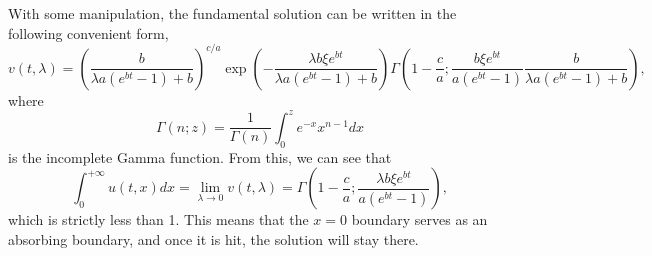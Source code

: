 \documentclass[12pt]{article}
\begin{document}
    With some manipulation, the fundamental solution can be written in the following convenient form,
    \begin{equation}
      v(t,\lambda) = \left(\frac{b}{\lambda a(e^{bt}-1)+b}\right)^{c/a}\exp\left(-\frac{\lambda b\xi e^{bt}}{\lambda a(e^{bt}-1)+b}\right)
                      \Gamma\left(1-\frac{c}{a};\frac{b\xi e^{bt}}{a(e^{bt}-1)}\frac{b}{\lambda a(e^{bt}-1)+b}\right),
      \label{solution1}
    \end{equation}
    where
    \begin{equation}
      \Gamma(n;z)=\frac{1}{\Gamma(n)}\int_0^ze^{-x}x^{n-1}dx
    \end{equation}
    is the incomplete Gamma function. From this, we can see that
    \begin{equation}
      \int_0^{+\infty}u(t,x)dx = \lim_{\lambda\rightarrow 0}v(t,\lambda) = \Gamma\left(1-\frac{c}{a};\frac{\lambda b\xi e^{bt}}{a(e^{bt}-1)}\right),
    \end{equation}
    which is strictly less than 1. This means that the $x=0$ boundary serves as an absorbing boundary, and once it is hit, the solution will stay there.
\end{document}
